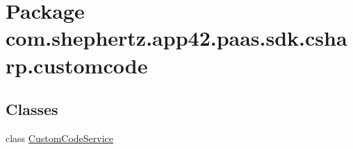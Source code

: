 \hypertarget{namespacecom_1_1shephertz_1_1app42_1_1paas_1_1sdk_1_1csharp_1_1customcode}{\section{Package com.\+shephertz.\+app42.\+paas.\+sdk.\+csharp.\+customcode}
\label{namespacecom_1_1shephertz_1_1app42_1_1paas_1_1sdk_1_1csharp_1_1customcode}
}
\subsection*{Classes}
\begin{DoxyCompactItemize}
\item 
class \hyperlink{classcom_1_1shephertz_1_1app42_1_1paas_1_1sdk_1_1csharp_1_1customcode_1_1_custom_code_service}{Custom\+Code\+Service}
\end{DoxyCompactItemize}
